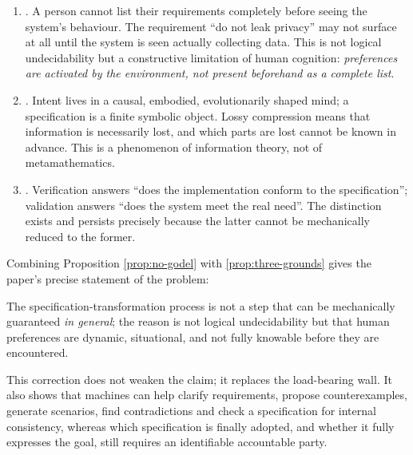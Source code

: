 \begin{proposition}\label{prop:three-grounds}
\begin{enumerate}[label=(\roman*)]
\item {}. A person cannot list their
      requirements completely before seeing the system's behaviour. The requirement ``do
      not leak privacy'' may not surface at all until the system is seen actually
      collecting data. This is not logical undecidability but a constructive limitation of
      human cognition: \emph{preferences are activated by the environment, not present
      beforehand as a complete list}.
\item {}. Intent lives in a causal,
      embodied, evolutionarily shaped mind; a specification is a finite symbolic object.
      Lossy compression means that information is necessarily lost, and which parts are
      lost cannot be known in advance. This is a phenomenon of information theory, not of
      metamathematics.
\item {}.
      Verification answers ``does the implementation conform to the specification'';
      validation answers ``does the system meet the real need''. The distinction exists and
      persists precisely because the latter cannot be mechanically reduced to the former.
\end{enumerate}
\end{proposition}

Combining Proposition \ref{prop:no-godel} with \ref{prop:three-grounds} gives the paper's
precise statement of the problem:

\begin{principle}\label{pr:gap}
The specification-transformation process is not a step that can be mechanically guaranteed
\emph{in general}; the reason is not logical undecidability but that human preferences are
dynamic, situational, and not fully knowable before they are encountered.
\end{principle}

This correction does not weaken the claim; it replaces the load-bearing wall. It also shows
that machines can help clarify requirements, propose counterexamples, generate scenarios,
find contradictions and check a specification for internal consistency, whereas which
specification is finally adopted, and whether it fully expresses the goal, still requires an
identifiable accountable party.

